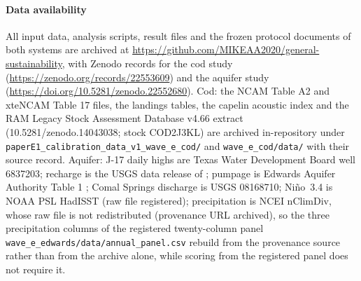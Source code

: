 \documentclass[preprint,11pt,authoryear]{elsarticle}
\theoremstyle{definition}
\theoremstyle{remark}
\begin{document}
\paragraph{Data availability} All input data, analysis scripts, result files and the frozen protocol documents of both systems are archived at \url{https://github.com/MIKEAA2020/general-sustainability}, with Zenodo records for the cod study (\url{https://zenodo.org/records/22553609}) and the aquifer study (\url{https://doi.org/10.5281/zenodo.22552680}). Cod: the NCAM Table A2 and xteNCAM Table 17 files, the landings tables, the capelin acoustic index and the RAM Legacy Stock Assessment Database v4.66 extract (10.5281/zenodo.14043038; stock COD2J3KL) are archived in-repository under \texttt{paperE1\_calibration\_data\_v1\_wave\_e\_cod/} and \texttt{wave\_e\_cod/data/} with their source record. Aquifer: J-17 daily highs are Texas Water Development Board well 6837203; recharge is the USGS data release of \citet{UmphresChoi2025}; pumpage is Edwards Aquifer Authority Table 1 \citep{EAA2024}; Comal Springs discharge is USGS 08168710; Ni\~no~3.4 is NOAA PSL HadISST (raw file registered); precipitation is NCEI nClimDiv, whose raw file is not redistributed (provenance URL archived), so the three precipitation columns of the registered twenty-column panel \texttt{wave\_e\_edwards/data/annual\_panel.csv} rebuild from the provenance source rather than from the archive alone, while scoring from the registered panel does not require it.
\end{document}
